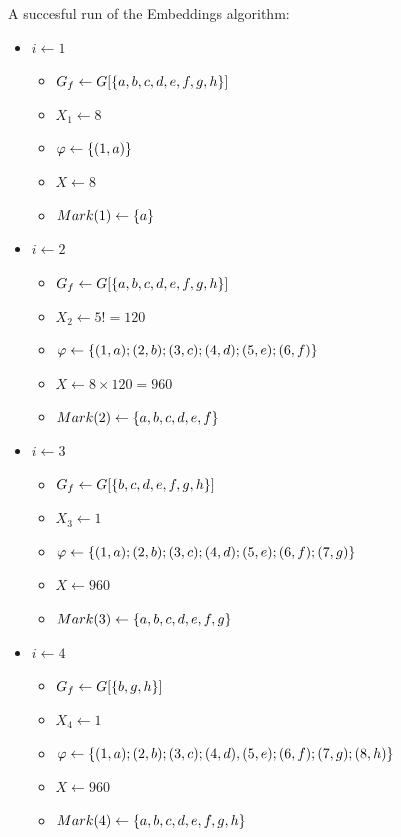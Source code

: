 \documentclass[a4paper,english,12pt,]{scrartcl}
\renewcommand{\phi}{\varphi}
\begin{document}
A succesful run of the Embeddings algorithm: %
\begin{multicols}{2}
\footnotesize
\begin{itemize}
 \item $i\leftarrow 1$
    \begin{itemize}
      \item $G_f \leftarrow G[\{a,b,c,d,e,f,g,h\}]$
      \item $X_1 \leftarrow 8$
      \item $\phi \leftarrow \mset{(1,a)}$
      \item $X \leftarrow 8$
      \item $Mark(1) \leftarrow \{a\}$
    \end{itemize}

 \item $i\leftarrow 2$
  \begin{itemize}
      \item $G_f \leftarrow G[\{a,b,c,d,e,f,g,h\}]$
      \item $X_2 \leftarrow 5! = 120$
      \item $\phi \leftarrow \mset{(1,a);(2,b);(3,c);(4,d);(5,e);(6,f)}$
      \item $X \leftarrow 8\times 120 = 960$
      \item $Mark(2) \leftarrow \{a,b,c,d,e,f\}$
    \end{itemize}


 \item $i\leftarrow 3$
  \begin{itemize}
      \item $G_f \leftarrow G[\{b,c,d,e,f,g,h\}]$
      \item $X_3 \leftarrow 1$
      \item $\phi \leftarrow \mset{(1,a);(2,b);(3,c);(4,d);(5,e);(6,f);(7,g)}$
      \item $X \leftarrow 960$
      \item $Mark(3) \leftarrow \{a,b,c,d,e,f,g\}$
    \end{itemize}

 \item $i\leftarrow 4$
  \begin{itemize}
      \item $G_f \leftarrow G[\{b,g,h\}]$
      \item $X_4 \leftarrow 1$
      \item $\phi \leftarrow \mset{(1,a);(2,b);(3,c);(4,d),(5,e);(6,f);(7,g);(8,h)}$
      \item $X \leftarrow 960$
      \item $Mark(4) \leftarrow \{a,b,c,d,e,f,g,h\}$
    \end{itemize}

\end{itemize}
\end{multicols}
\end{document}
